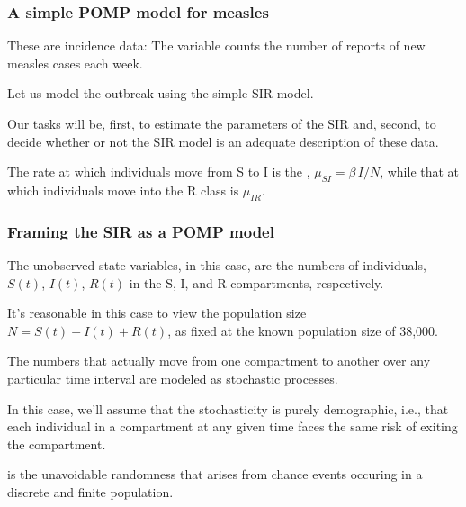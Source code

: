 \documentclass{beamer}\usepackage[]{graphicx}\usepackage[]{color}
\begin{document}
\begin{frame}[fragile] 

\frametitle{A simple POMP model for measles}


\bi

\item These are incidence data: The  variable counts the number of reports of new measles cases each week.

\item Let us model the outbreak using the simple SIR model.

\item Our tasks will be, first, to estimate the parameters of the SIR and, second, to decide whether or not the SIR model is an adequate description of these data.


\item The rate at which individuals move from S to I is the , $\mu_{SI}=\beta\,I/N$, while that at which individuals move into the R class is $\mu_{IR}$.

\ei

\end{frame}

\begin{frame}[fragile]

\frametitle{Framing the SIR as a POMP model}

\bi


\item The unobserved state variables, in this case, are the numbers of individuals, $S(t)$, $I(t)$, $R(t)$ in the S, I, and R compartments, respectively.

\item It's reasonable in this case to view the population size $N=S(t)+I(t)+R(t)$, as fixed at the known population size of 38,000.

\item The numbers that actually move from one compartment to another over any particular time interval are modeled as stochastic processes.

\item In this case, we'll assume that the stochasticity is purely demographic, i.e., that each individual in a compartment at any given time faces the same risk of exiting the compartment.

\item {} is the unavoidable randomness that arises from chance events occuring in a discrete and finite population.

\ei

\end{frame}
\end{document}
